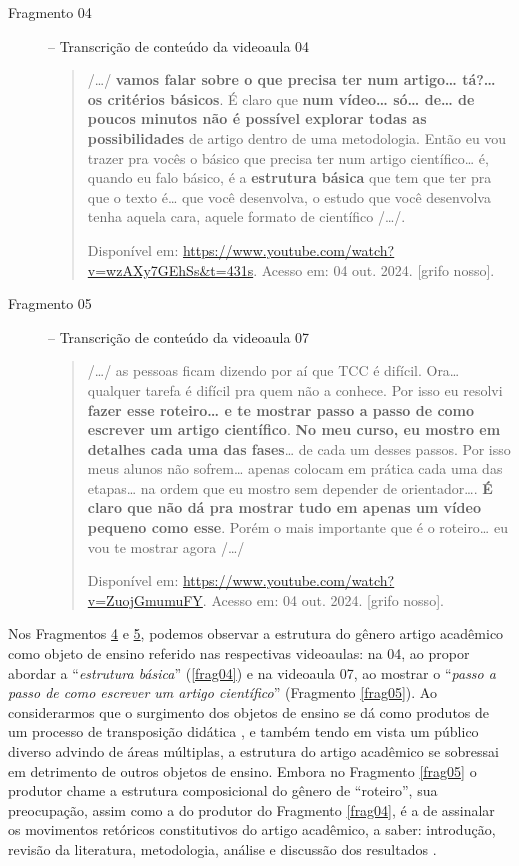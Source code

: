 \begin{description}
    \item[Fragmento 04\label{frag04}] -- Transcrição de conteúdo da videoaula 04

\begin{quote}
/\ldots/ \textbf{vamos falar sobre o que precisa ter num artigo\ldots{}
tá?\ldots{} os critérios básicos}. É claro que \textbf{num vídeo\ldots{}
só\ldots{} de\ldots{} de poucos minutos não é possível explorar todas as
possibilidades} de artigo dentro de uma metodologia. Então eu vou trazer
pra vocês o básico que precisa ter num artigo científico\ldots{} é,
quando eu falo básico, é a \textbf{estrutura básica} que tem que ter pra
que o texto é\ldots{} que você desenvolva, o estudo que você desenvolva
tenha aquela cara, aquele formato de científico /\ldots/.

Disponível em:
\url{https://www.youtube.com/watch?v=wzAXy7GEhSs\&t=431s}.
Acesso em: 04 out. 2024. {[}grifo nosso{]}.
\end{quote}

    \item[Fragmento 05\label{frag05}] -- Transcrição de conteúdo da videoaula 07

\begin{quote}
/\ldots/ as pessoas ficam dizendo por aí que TCC é difícil. Ora\ldots{}
qualquer tarefa é difícil pra quem não a conhece. Por isso eu resolvi
\textbf{fazer esse roteiro\ldots{} e te mostrar passo a passo de como
escrever um artigo científico}. \textbf{No meu curso, eu mostro em
detalhes cada uma das fases}\ldots{} de cada um desses passos. Por isso
meus alunos não sofrem\ldots{} apenas colocam em prática cada uma das
etapas\ldots{} na ordem que eu mostro sem depender de orientador\ldots.
\textbf{É claro que não dá pra mostrar tudo em apenas um vídeo pequeno
como esse}. Porém o mais importante que é o roteiro\ldots{} eu vou te
mostrar agora /\ldots/

Disponível em:
\url{https://www.youtube.com/watch?v=ZuojGmumuFY}.
Acesso em: 04 out. 2024. {[}grifo nosso{]}.
\end{quote}
\end{description}

Nos Fragmentos \hyperref[frag04]{4} e \hyperref[frag05]{5}, podemos observar a estrutura do gênero artigo
acadêmico como objeto de ensino referido nas respectivas videoaulas: na
04, ao propor abordar a ``\emph{estrutura básica}'' (\ref{frag04}) 
e na videoaula 07, ao mostrar o ``\emph{passo a passo de
como escrever um artigo científico}'' (Fragmento \ref{frag05}). Ao
considerarmos que o surgimento dos objetos de ensino se dá como produtos
de um processo de transposição didática \cite{linodearaujo2014}, e também
tendo em vista um público diverso advindo de áreas múltiplas, a
estrutura do artigo acadêmico se sobressai em detrimento de outros
objetos de ensino. Embora no Fragmento \ref{frag05} o produtor chame a estrutura
composicional do gênero de ``roteiro'', sua preocupação, assim como a do
produtor do Fragmento \ref{frag04}, é a de assinalar os movimentos retóricos
constitutivos do artigo acadêmico, a saber: introdução, revisão da
literatura, metodologia, análise e discussão dos resultados \cite{motta-roth2010}.

